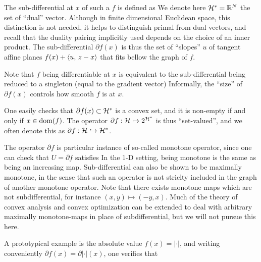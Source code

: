 The sub-differential at $x$ of such a $f$ is defined as
We denote here $\mathcal{H}^* = \mathbb{R}^N$ the set of ``dual'' vector. Although in finite dimensional Euclidean space, this distinction is not needed, it helps to distinguish primal from dual vectors, and recall that the duality pairing implicitly used depends on the choice of an inner product.
%
The sub-differential $\partial f(x)$ is thus the set of ``slopes'' $u$ of tangent affine planes $f(x) + \langle u,\,z-x\rangle$ that fits bellow the graph of $f$. 

Note that $f$ being differentiable at $x$ is equivalent to the sub-differential being reduced to a singleton (equal to the gradient vector)
Informally, the ``size'' of $\partial f(x)$ controls how smooth $f$ is at $x$.

One easily checks that $\partial f(x) \subset \mathcal{H}^*$ is a convex set, and it is non-empty if and only if $x \in \operatorname{dom}(f)$.
%
The operator $\partial f : \mathcal{H} \mapsto 2^{\mathcal{H}^*}$ is thus ``set-valued'', and we often denote this as $\partial f : \mathcal{H} \hookrightarrow \mathcal{H}^*$.

\begin{rem}
The operator $\partial f$ is particular instance of so-called monotone operator, since one can check that $U=\partial f$ satisfies 
In the 1-D setting, being monotone is the same as being an increasing map.
%
Sub-differential can also be shown to be maximally monotone, in the sense that such an operator is not striclty included in the graph of another monotone operator. 
%
Note that there exists monotone maps which are not subdifferential, for instance $(x,y) \mapsto (-y,x)$. 
% 
Much of the theory of convex analysis and convex optimization can be extended to deal with arbitrary maximally monotone-maps in place of subdifferential, but we will not pursue this here.
\end{rem}

A prototypical example is the absolute value $f(x)=|\cdot|$, and writing conveniently $\partial f(x) = \partial |\cdot|(x)$, one verifies that


